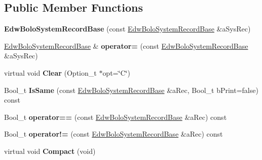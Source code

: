 \subsection*{Public Member Functions}
\begin{DoxyCompactItemize}
\item 
\hypertarget{class_edw_bolo_system_record_base_a12edacabe458147374adca44c9681f76}{
{\bfseries EdwBoloSystemRecordBase} (const \hyperlink{class_edw_bolo_system_record_base}{EdwBoloSystemRecordBase} \&aSysRec)}
\label{class_edw_bolo_system_record_base_a12edacabe458147374adca44c9681f76}

\item 
\hypertarget{class_edw_bolo_system_record_base_a1a590e50f64813bf44fb8e136cc156f2}{
\hyperlink{class_edw_bolo_system_record_base}{EdwBoloSystemRecordBase} \& {\bfseries operator=} (const \hyperlink{class_edw_bolo_system_record_base}{EdwBoloSystemRecordBase} \&aSysRec)}
\label{class_edw_bolo_system_record_base_a1a590e50f64813bf44fb8e136cc156f2}

\item 
\hypertarget{class_edw_bolo_system_record_base_ad3bb09d334cdcdab9a910afc54300217}{
virtual void {\bfseries Clear} (Option\_\-t $\ast$opt=\char`\"{}C\char`\"{})}
\label{class_edw_bolo_system_record_base_ad3bb09d334cdcdab9a910afc54300217}

\item 
\hypertarget{class_edw_bolo_system_record_base_a72b37411fe1ecb01a87a5a717c29717b}{
Bool\_\-t {\bfseries IsSame} (const \hyperlink{class_edw_bolo_system_record_base}{EdwBoloSystemRecordBase} \&aRec, Bool\_\-t bPrint=false) const }
\label{class_edw_bolo_system_record_base_a72b37411fe1ecb01a87a5a717c29717b}

\item 
\hypertarget{class_edw_bolo_system_record_base_a0c72e4be4936cfd8f03890edd5d77217}{
Bool\_\-t {\bfseries operator==} (const \hyperlink{class_edw_bolo_system_record_base}{EdwBoloSystemRecordBase} \&aRec) const }
\label{class_edw_bolo_system_record_base_a0c72e4be4936cfd8f03890edd5d77217}

\item 
\hypertarget{class_edw_bolo_system_record_base_a13b3a691513f0492a33f896109d411b7}{
Bool\_\-t {\bfseries operator!=} (const \hyperlink{class_edw_bolo_system_record_base}{EdwBoloSystemRecordBase} \&aRec) const }
\label{class_edw_bolo_system_record_base_a13b3a691513f0492a33f896109d411b7}

\item 
\hypertarget{class_edw_bolo_system_record_base_a38e2ff5066f7aebb0ca42e2e0d4a9d27}{
virtual void {\bfseries Compact} (void)}
\label{class_edw_bolo_system_record_base_a38e2ff5066f7aebb0ca42e2e0d4a9d27}


\end{DoxyCompactItemize}
